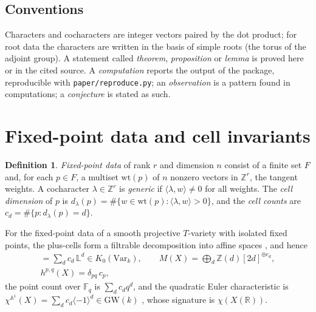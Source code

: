 \documentclass[11pt]{amsart}
\theoremstyle{definition}
\newtheorem{definition}[theorem]{Definition}
\theoremstyle{remark}
\newcommand{\code}[1]{\texttt{#1}}
\newcommand{\ZZ}{\mathbb{Z}}
\newcommand{\RR}{\mathbb{R}}
\newcommand{\LL}{\mathbb{L}}
\newcommand{\GW}{\mathrm{GW}}
\newcommand{\wt}{\mathrm{wt}}
\begin{document}
\subsection*{Conventions}
Characters and cocharacters are integer vectors paired by the dot product;
for root data the characters are written in the basis of simple roots
(the torus of the adjoint group). A statement called \emph{theorem},
\emph{proposition} or \emph{lemma} is proved here or in the cited source. A
\emph{computation} reports the output of the package, reproducible with
\code{paper/reproduce.py}; an \emph{observation} is a pattern found in
computations; a \emph{conjecture} is stated as such.

\section{Fixed-point data and cell invariants}\label{sec:basics}

\begin{definition}
\emph{Fixed-point data} of rank $r$ and dimension $n$ consist of a finite
set $F$ and, for each $p\in F$, a multiset $\wt(p)$ of $n$ nonzero vectors in
$\ZZ^r$, the tangent weights. A cocharacter $\lambda\in\ZZ^r$ is
\emph{generic} if $\langle\lambda,w\rangle\ne 0$ for all weights. The
\emph{cell dimension} of $p$ is $d_\lambda(p) = \#\{w\in\wt(p) :
\langle\lambda,w\rangle>0\}$, and the \emph{cell counts} are
$c_d = \#\{p : d_\lambda(p)=d\}$.
\end{definition}

For the fixed-point data of a smooth projective $T$-variety with isolated
fixed points, the plus-cells form a filtrable decomposition into affine
spaces \cite{BB73}, and hence
\begin{gather*}
[X] = \sum_d c_d\,\LL^d \in K_0(\mathrm{Var}_k),\qquad
M(X) = \bigoplus_d \ZZ(d)[2d]^{\oplus c_d},\\
h^{p,q}(X) = \delta_{pq}\,c_p ,
\end{gather*}
the point count over $\mathbb F_q$ is $\sum_d c_d q^d$, and the quadratic
Euler characteristic is $\chi^{\mathbb A^1}(X) = \sum_d c_d\langle -1\rangle^d
\in \GW(k)$ \cite{Levine,Hoyois}, whose signature is $\chi(X(\RR))$.
\end{document}
